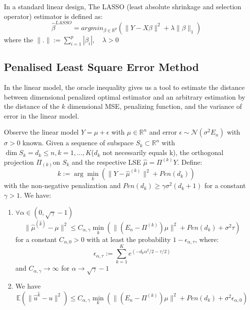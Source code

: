 \begin{definition}
In a standard linear design, The LASSO (least absolute shrinkage and selection operator) estimator is defined as:
\begin{equation}
    \hat{\beta}^{LASSO} =  argmin_{\beta \in \mathbb{R}^p}( \|Y - X\beta \|^2 + \lambda \| \beta \|_1)
\end{equation}
where the $\|.\| := \sum_{i = 1}^{p} |\beta_i|, \quad \lambda > 0$
\end{definition}
\newpage



\subsection{Penalised Least Square Error Method}
In the linear model, the oracle inequality gives us a tool to estimate the distance between dimensional penalized optimal estimator and an arbitrary estimation by the distance of the $k$ dimensional MSE, penalizing function, and the variance of error in the linear model.  

\begin{theorem}
Observe the linear model $Y = \mu + \epsilon$ with $\mu \in \mathbb{R}^n$ and error $\epsilon \sim \mathcal{N}(\sigma^2 E_n)$ with $\sigma > 0$ known. Given a sequence of subspace $S_k \subset \mathbb{R}^n$ with $\dim S_k = d_k \leq n, k = 1, \dots, K$($d_k$ not necessarily equals k), the orthogonal projection $\Pi_{(k)}$on $S_k$ and the respective LSE $\hat{\mu} = \Pi^{(k)} Y$. Define:
\begin{equation}
    \hat{k} := \arg\min_k (\| Y - \hat{\mu}^{(k)} \|^2 + Pen(d_k))
\end{equation}          
with the non-negative penalization and $Pen(d_k) \geq \gamma \sigma^2 (d_k + 1)$ for a constant $\gamma > 1$. We have:
\begin{enumerate}
    \item $\forall \alpha \in (0,\sqrt{\gamma} - 1)$  
    \begin{equation}
        \| \hat{\mu}^{(\hat{k})} - \mu \|^2 \leq C_{\alpha, \gamma} \min_k (\| (E_n - \Pi^{(k)})\mu \|^2 + Pen(d_k) + \sigma^2 \tau)
    \end{equation}
    for a constant $C_{\alpha, 0} > 0$ with at least the probability $1 - \epsilon_{\alpha, \tau}$, where:
    \begin{equation}
        \epsilon_{\alpha, \tau} := \sum_{k = 1}^{K} e^{(-d_k \alpha^2/2 - \tau/2)}
    \end{equation}
    and $C_{\alpha, \gamma} \longrightarrow \infty$ for $\alpha \longrightarrow \sqrt{\gamma} -1$
    
    \item We have
    \begin{equation*}
    	\mathbb{E}(\|\hat{u}^{\hat{k}} - u \|^2) \leq C_{\alpha, \gamma} \min_k (\| (E_n - \Pi^{(k)})\mu \|^2 + Pen(d_k) + \sigma^2 \epsilon_{\alpha, 0})
    \end{equation*}
\end{enumerate}
\end{theorem}

